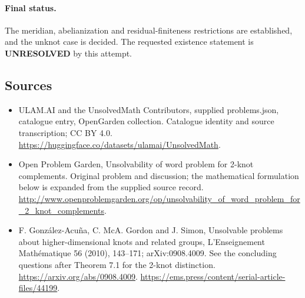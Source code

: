 \documentclass[11pt,a4paper]{article}
\begin{document}
\paragraph{Final status.}
The meridian, abelianization and residual-finiteness restrictions are established, and the unknot case is decided. The requested existence statement is \textbf{UNRESOLVED} by this attempt.

\subsection{Sources}
\begin{itemize}
\item[S1] ULAM.AI and the UnsolvedMath Contributors, supplied problems.json, catalogue entry, OpenGarden collection. Catalogue identity and source transcription; CC BY 4.0.
\url{https://huggingface.co/datasets/ulamai/UnsolvedMath}.
\item[S2] Open Problem Garden, Unsolvability of word problem for 2-knot complements. Original problem and discussion; the mathematical formulation below is expanded from the supplied source record.
\url{http://www.openproblemgarden.org/op/unsolvability_of_word_problem_for_2_knot_complements}.
\item[S3] F. González-Acuña, C. McA. Gordon and J. Simon, Unsolvable problems about higher-dimensional knots and related groups, L'Enseignement Mathématique 56 (2010), 143--171; arXiv:0908.4009. See the concluding questions after Theorem 7.1 for the 2-knot distinction.
\url{https://arxiv.org/abs/0908.4009}.
\url{https://ems.press/content/serial-article-files/44199}.
\end{itemize}
\end{document}

